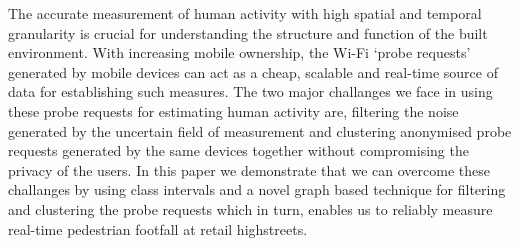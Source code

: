 The accurate measurement of human activity with high spatial and temporal granularity is crucial for understanding the structure and function of the built environment.
With increasing mobile ownership, the Wi-Fi `probe requests' generated by mobile devices can act as a cheap, scalable and real-time source of data for establishing such measures.
The two major challanges we face in using these probe requests for estimating human activity are, filtering the noise generated by the uncertain field of measurement and clustering anonymised probe requests generated by the same devices together without compromising the privacy of the users.
In this paper we demonstrate that we can overcome these challanges by using class intervals and a novel graph based technique for filtering and clustering the probe requests which in turn, enables us to reliably measure real-time pedestrian footfall at retail highstreets.
